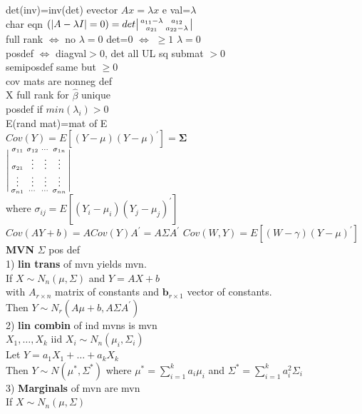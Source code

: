 \documentclass[10pt,landscape]{article}
\newenvironment{lsmallmatrix}
{\left|\begin{smallmatrix}}
	{\end{smallmatrix}\right|}
\newcommand{\lm}{\lambda}
\newcommand{\sg}{\sigma}
\newcommand{\hb}{\hat{\beta}}
\newcommand{\lra}{\Leftrightarrow}
\begin{document}
\begin{multicols*}{4}
det(inv)=inv(det)\quad
evector $Ax=\lm x$\quad
e val=$\lm$\\
char eqn $(|A-\lm I|=0)
=det\begin{lsmallmatrix}
a_{11}-\lm & a_{12}\\
a_{21} & a_{22}-\lm
\end{lsmallmatrix}$\\
full rank $\lra$ no $\lm=0$\quad
det=0  $\lra$ $\geq 1$ $\lm=0$\\
posdef $\lra$ diagval$>0$,
det all UL sq submat $>0$\\
semiposdef same but $\geq0$\\
cov mats are nonneg def\\
X full rank for $\hb$ unique\\
posdef if $min(\lm_i)>0$\\
E(rand mat)=mat of E\\
$Cov(Y)=E[(Y-\mu)(Y-\mu)^{'}]=\bm{\Sigma}$\\
$\begin{lsmallmatrix}
	\sigma_{11}&\sigma_{12}&\cdots& \sg_{1n}\\
	\sg_{21}& \vdots & \vdots & \vdots\\
	\vdots & \vdots & \vdots & \vdots\\
	\sg_{n1} &\cdots & \cdots& \sg_{nn} 
\end{lsmallmatrix}$\\
where $\sg_{ij}=E[(Y_i-\mu_i)(Y_j-\mu_j)^{'}]$\\
$Cov(AY+b)=A Cov(Y)A^{'}=A\Sigma A^{'}$
$Cov(W,Y)=E[(W-\gamma)(Y-\mu)^{'}]$\\
\textbf{MVN}
$\Sigma$ pos def\\
1) \textbf{lin trans} of mvn yields  mvn.\\
	If $X\sim N_n(\mu,\Sigma)$ and $Y=AX+b$\\
	with $A_{r\times n}$  matrix of constants and $\bm{b}_{r \times 1}$ vector of constants.\\
	Then $Y\sim N_r(A\mu+b,A\Sigma A^{'})$\\
	2) \textbf{lin combin} of ind mvns is mvn\\
	$X_1,\dots,X_k$ iid $X_i\sim N_n(\mu_i,\Sigma_i)$\\
	Let $Y=a_1X_1+\dots+a_kX_k$\\
	Then $Y\sim N(\mu^*,\Sigma^*)$ where $\mu^{*}=\sum_{i=1}^{k}a_i\mu_i$ and $\Sigma^*=\sum_{i=1}^{k}a_i^2\Sigma_i$\\
	3) \textbf{Marginals} of mvn are mvn\\
	If $X\sim N_n(\mu,\Sigma)$\\

\end{multicols*}
\end{document}
